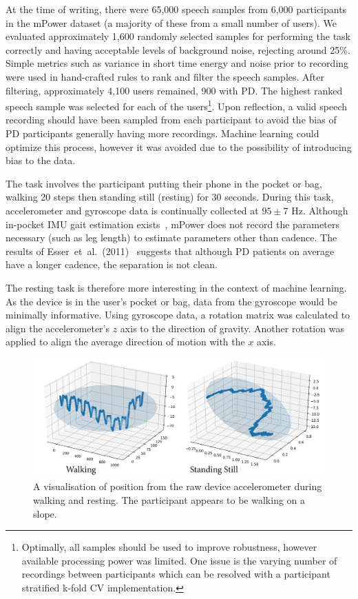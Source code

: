 \documentclass[12pt, twoside]{book}
\renewcommand\emph[1]{\textit{\color{USred}{#1}}}
\begin{document}
At the time of writing, there were 65,000 speech samples from 6,000 participants in the mPower dataset (a majority of these from a small number of users). We evaluated approximately 1,600 randomly selected samples for performing the task correctly and having acceptable levels of background noise, rejecting around 25\%. Simple metrics such as variance in short time energy and noise prior to recording were used in hand-crafted rules to rank and filter the speech samples. After filtering, approximately 4,100 users remained, 900 with PD. The highest ranked speech sample was selected for each of the users\footnote{Optimally, all samples should be used to improve robustness, however available processing power was limited. One issue is the varying number of recordings between participants which can be resolved with a participant stratified k-fold CV implementation.}. Upon reflection, a valid speech recording should have been sampled from each participant to avoid the bias of PD participants generally having more recordings. Machine learning could optimize this process, however it was avoided due to the possibility of introducing bias to the data. 

The \emph{walking} task involves the participant putting their phone in the pocket or bag, walking 20 steps then standing still (resting) for 30 seconds. During this task, accelerometer and gyroscope data is continually collected at $95\pm7$ Hz. Although in-pocket IMU gait estimation exists~\cite{diaz2014step}, mPower does not record the parameters necessary (such as leg length) to estimate parameters other than cadence. The results of Esser~et~al.~(2011)~\cite{esser2011assessment} suggests that although PD patients on average have a longer cadence, the separation is not clean.

The resting task is therefore more interesting in the context of machine learning. As the device is in the user's pocket or bag, data from the gyroscope would be minimally informative. Using gyroscope data, a rotation matrix was calculated to align the accelerometer's $z$ axis to the direction of gravity. Another rotation was applied to align the average direction of motion with the $x$ axis.

\begin{figure}[h]
\label{mpowerwalking}
\centering\includegraphics[width=0.9\linewidth]{pathvis3d.png}
\caption{A visualisation of position from the raw device accelerometer during walking and resting. The participant appears to be walking on a slope.}
\end{figure}
\end{document}
